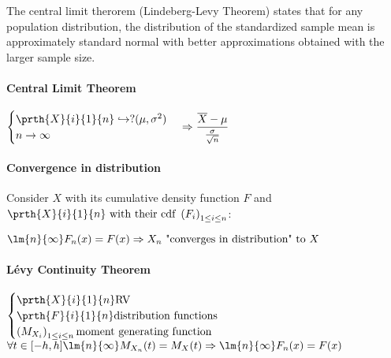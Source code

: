 The central limit therorem (Lindeberg-Levy Theorem) states that for any
population distribution, the distribution of the standardized sample mean
is approximately standard normal with better approximations obtained with
the larger sample size.
\paragraph{Central Limit Theorem}
\begin{center}
	$\begin{cases}\prth{X}{i}{1}{n}\hookrightarrow ?(\mu,\sigma^{2})\\ n\rightarrow\infty\end{cases} \Rightarrow \dfrac{\overline{X}-\mu}{\frac{\sigma}{\sqrt{n}}}$
\end{center}
\paragraph{Convergence in distribution}
Consider $X$ with its cumulative density function $F$ and $\prth{X}{i}{1}{n}\text{ with their cdf }\left( F_{i} \right)_{1\leq i\leq n}$:
\begin{center}
	$\lm{n}{\infty}F_{n}(x)=F(x)\Rightarrow X_{n}\text{ "converges in distribution" to }X$
\end{center}
\paragraph{Lévy Continuity Theorem}
\begin{center}
	$
	\begin{cases}	
		\prth{X}{i}{1}{n}\text{RV}\\
		\prth{F}{i}{1}{n}\text{distribution functions}\\
		\left( M_{X_{i}} \right)_{1\leq i\leq n}\text{moment generating function}
	\end{cases}$
	$\forall t\in [-h,h]\lm{n}{\infty}M_{X_{n}}(t)=M_{X}(t)\Rightarrow
	\lm{n}{\infty}F_{n}(x)=F(x)
	$
\end{center}
